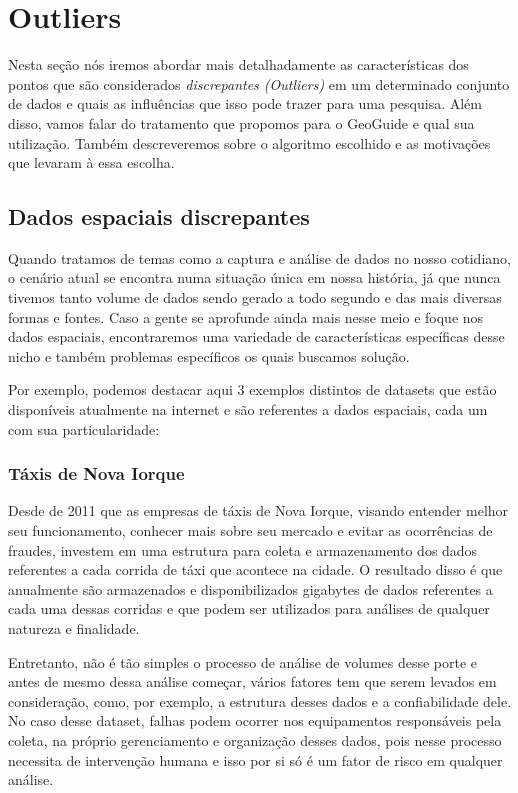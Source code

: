 \chapter{Outliers}

Nesta seção nós iremos abordar mais detalhadamente as características dos pontos que são considerados \textit{discrepantes (Outliers)}  em um determinado conjunto de dados e quais as influências que isso pode trazer para uma pesquisa. Além disso, vamos falar do tratamento que propomos para o GeoGuide e qual sua utilização. Também descreveremos sobre o algoritmo escolhido e as motivações que levaram à essa escolha.

\section{Dados espaciais discrepantes}

Quando tratamos de temas como a captura e análise de dados no nosso cotidiano, o cenário atual se encontra numa situação única em nossa história, já que nunca tivemos tanto volume de dados sendo gerado a todo segundo e das mais diversas formas e fontes. Caso a gente se aprofunde ainda mais nesse meio e foque nos dados espaciais, encontraremos uma variedade de características específicas desse nicho e também problemas específicos os quais buscamos solução.

Por exemplo, podemos destacar aqui 3 exemplos distintos de datasets que estão disponíveis atualmente na internet e são referentes a dados espaciais, cada um com sua particularidade:

\subsection{Táxis de Nova Iorque}

Desde de 2011 que as empresas de táxis de Nova Iorque, visando entender melhor seu funcionamento, conhecer mais sobre seu mercado e evitar as ocorrências de fraudes, investem em uma estrutura para coleta e armazenamento dos dados referentes a cada corrida de táxi que acontece na cidade. O resultado disso é que anualmente são armazenados e disponibilizados gigabytes de dados referentes a cada uma dessas corridas e que podem ser utilizados para análises de qualquer natureza e finalidade.

Entretanto, não é tão simples o processo de análise de volumes desse porte e antes de mesmo dessa análise começar, vários fatores tem que serem levados em consideração, como, por exemplo, a estrutura desses dados e a confiabilidade dele. No caso desse dataset, falhas podem ocorrer nos equipamentos responsáveis pela coleta, na próprio gerenciamento e organização desses dados, pois nesse processo necessita de intervenção humana e isso por si só é um fator de risco em qualquer análise.

